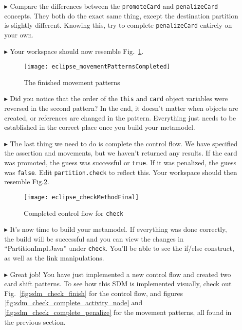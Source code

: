 \begin{itemize}
\item[$\blacktriangleright$] Compare the differences between the \texttt{promoteCard} and \texttt{penalizeCard} concepts. They both do the exact same thing,
except the destination partition is slightly different. Knowing this, try to complete \texttt{penalizeCard} entirely on your own.

\item[$\blacktriangleright$] Your workspace should now resemble Fig.~\ref{fig:completedPatterns}.

\begin{figure}[htbp]
\begin{center}
  \texttt{[image: eclipse\_movementPatternsCompleted]}
  \caption{The finished movement patterns}
  \label{fig:completedPatterns}
\end{center}
\end{figure}

\item[$\blacktriangleright$] Did you notice that the order of the \texttt{this} and \texttt{card} object variables were reversed in the second pattern? In the
end, it doesn't matter when objects are created, or references are changed in the pattern. Everything just needs to be established in the correct place once
you build your metamodel.

\item[$\blacktriangleright$] The last thing we need to do is complete the control flow. We have specified the assertion and movements, but we haven't
returned any results. If the card was promoted, the guess was successful or \texttt{true}. If it was penalized, the guess was \texttt{false}. Edit
\texttt{partition.check} to reflect this. Your workspace should then resemble Fig.\ref{fig:finalMethod}.

\begin{figure}[htbp]
\begin{center}
  \texttt{[image: eclipse\_checkMethodFinal]}
  \caption{Completed control flow for \texttt{check}}
  \label{fig:finalMethod}
\end{center}
\end{figure}

\item[$\blacktriangleright$] It's now time to build your metamodel. If everything was done correctly, the build will be successful and you can view the changes
in ``PartitionImpl.Java'' under \texttt{check}. You'll be able to see the if/else construct, as well as the link manipulations.

\item[$\blacktriangleright$] Great job! You have just implemented a new control flow and created two card shift patterns. To see how this SDM is implemented
visually, check out Fig.~\ref{fig:sdm_check_finish} for the control flow, and figures \ref{fig:sdm_check_complete_activity_node} and
\ref{fig:sdm_check_complete_penalize} for the movement patterns, all found in the previous section.


\end{itemize}
 